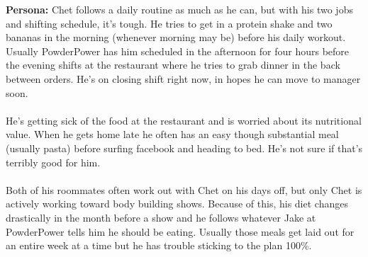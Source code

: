\documentclass[a4paper,12pt]{article}
\begin{document}
\begin{appendices}
\textbf{Persona:} Chet follows a daily routine as much as he can, but with his two jobs and shifting schedule, it's tough.  He tries to get in a protein shake and two bananas in the morning (whenever morning may be) before his daily workout.  Usually PowderPower has him scheduled in the afternoon for four hours before the evening shifts at the restaurant where he tries to grab dinner in the back between orders.  He's on closing shift right now, in hopes he can move to manager soon.\\
\\
He's getting sick of the food at the restaurant and is worried about its nutritional value.  When he gets home late he often has an easy though substantial meal (usually pasta) before surfing facebook and heading to bed.  He's not sure if that's terribly good for him.\\
\\
Both of his roommates often work out with Chet on his days off, but only Chet is actively working toward body building shows.  Because of this, his diet changes drastically in the month before a show and he follows whatever Jake at PowderPower tells him he should be eating.  Usually those meals get laid out for an entire week at a time but he has trouble sticking to the plan 100\%.
\end{appendices}
\end{document}
